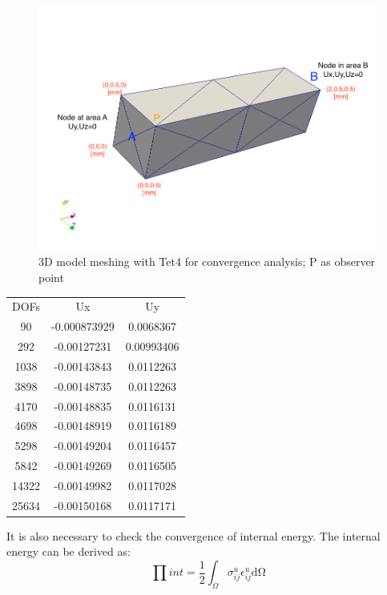 \begin{figure}[htbp]
	\begin{center}	
		\includegraphics[width=14cm,clip]{Convergence3D.png} 			
		\caption{3D model meshing with Tet4 for convergence analysis; P as observer point} \label{fig: Convergence3D}
	\end{center}
\end{figure}


\begin{tabular}{ c | c | c }
	\hline			
	DOFs & Ux & Uy \\
	90 & -0.000873929 & 0.0068367 \\
	292 & -0.00127231 & 0.00993406 \\
	1038 & -0.00143843 & 0.0112263 \\
	3898 & -0.00148735 &  0.0112263\\
	4170 & -0.00148835 &  0.0116131\\
	4698 & -0.00148919 &  0.0116189\\
	5298 & -0.00149204 &  0.0116457\\
	5842 & -0.00149269 &  0.0116505\\
	14322 & -0.00149982 & 0.0117028\\
	25634 & -0.00150168 & 0.0117171 \\
	\hline  
\end{tabular}

It is also necessary to check the convergence of internal energy. The internal energy can be derived as:
\begin{equation}
\prod int = \frac{1}{2}\int_\Omega \sigma_{ij}^u\epsilon_{ij}^u \mathrm{d \Omega}
\end{equation}


